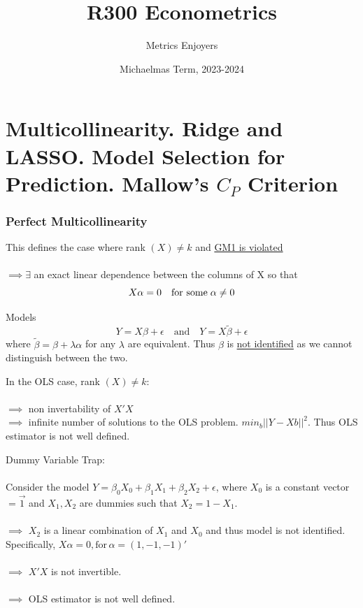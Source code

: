 \documentclass[DIV=14,titlepage=false]{scrreprt}
\title{%
R300 Econometrics}
\author{Metrics Enjoyers}
\date{Michaelmas Term, 2023-2024}
\begin{document}
\chapter{Multicollinearity. Ridge and LASSO. Model Selection for Prediction. Mallow's \(C_P\) Criterion}
\subsection{Perfect Multicollinearity}

\begin{definition}
    This defines the case where rank \((X) \neq k\) and \underline{GM1 is violated}
    \\ \\
    \(\implies \exists\) an exact linear dependence between the columns of X so that
    \[X\alpha=0 \quad \text{for some} \hspace{1mm} \alpha \neq 0\] 
\end{definition}

\vspace{5mm}

\begin{corollary}
    Models \[Y=X\beta+\epsilon \quad \text{and} \quad Y=X\tilde{\beta}+\epsilon\]
    where \(\tilde{\beta}=\beta+\lambda\alpha\) for any \(\lambda\) are equivalent. Thus \(\beta\) is \underline{not identified} as we cannot distinguish between the two.
\end{corollary}

\begin{corollary} In the OLS case, 
    rank \((X) \neq k\): \\ \\ \(\implies\) non invertability of \(X'X\) \\ \(\implies\) infinite number of solutions to the OLS problem. \(min_{b}||Y-Xb||^2\). Thus OLS estimator is not well defined.
\end{corollary}

\vspace{5mm}
\begin{example}
    Dummy Variable Trap: \\ \\
    Consider the model \(Y=\beta_0X_0+\beta_1X_1+\beta_2X_2+\epsilon\), where \(X_0\) is a constant vector \(=\vec{1}\) and \(X_1, X_2\) are dummies such that \(X_2=1-X_1\). \\ \\
    \(\implies\) \(X_2\) is a linear combination of \(X_1\) and \(X_0\) and thus model is not identified. Specifically, \(X\alpha=0, \text{for} \, \alpha = (1, -1, -1)'\) \\ \\
    \(\implies\) \(X'X\) is not invertible. \\ \\
    \(\implies\) OLS estimator is not well defined.
\end{example}
\end{document}
